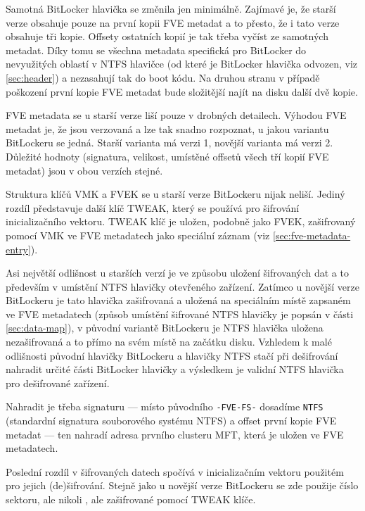 Samotná BitLocker hlavička se změnila jen minimálně. Zajímavé je, že starší verze obsahuje  pouze na první kopii FVE metadat a to přesto, že i tato verze obsahuje tři kopie. Offsety ostatních kopií je tak třeba vyčíst ze samotných metadat. Díky tomu se všechna metadata specifická pro BitLocker  do nevyužitých oblastí v NTFS hlavičce (od které je BitLocker hlavička odvozen, viz \ref{sec:header}) a nezasahují tak do boot kódu. Na druhou stranu v případě poškození první kopie FVE metadat bude složitější najít na disku další dvě  kopie.


FVE metadata se u starší verze liší pouze v drobných detailech. Výhodou FVE metadat je, že jsou verzovaná a lze tak snadno rozpoznat, u jakou variantu BitLockeru se jedná. Starší varianta má verzi 1, novější varianta má verzi 2. Důležité hodnoty (signatura, velikost, umístěné offsetů všech tří kopií FVE metadat) jsou v obou verzích stejné.


Struktura klíčů VMK a FVEK se u starší verze BitLockeru nijak neliší. Jediný rozdíl představuje další klíč TWEAK, který se používá pro šifrování inicializačního vektoru. TWEAK klíč je uložen, podobně jako FVEK, zašifrovaný pomocí VMK ve FVE metadatech jako speciální záznam (viz \ref{sec:fve-metadata-entry}).


Asi největší odlišnost u starších verzí je ve způsobu uložení šifrovaných dat a to především v umístění NTFS hlavičky otevřeného zařízení. Zatímco u novější verze BitLockeru je tato hlavička zašifrovaná a uložená na speciálním místě zapsaném ve FVE metadatech (způsob umístění šifrované NTFS hlavičky je popsán v části \ref{sec:data-map}), v původní variantě BitLockeru je NTFS hlavička uložena nezašifrovaná a to přímo na svém  místě na začátku disku. Vzhledem k malé odlišnosti původní hlavičky BitLockeru a hlavičky NTFS stačí při dešifrování nahradit určité části BitLocker hlavičky a výsledkem je validní NTFS hlavička pro dešifrované zařízení. 

Nahradit je třeba signaturu --- místo původního \texttt{-FVE-FS-} dosadíme \texttt{NTFS} (standardní signatura souborového systému NTFS) a offset první kopie FVE metadat --- ten nahradí adresa prvního clusteru MFT, která je uložen ve FVE metadatech.

Poslední rozdíl v šifrovaných datech spočívá v inicializačním vektoru použitém pro jejich (de)šifrování. Stejně jako u novější verze BitLockeru se zde použije číslo sektoru, ale nikoli , ale zašifrované pomocí TWEAK klíče.

